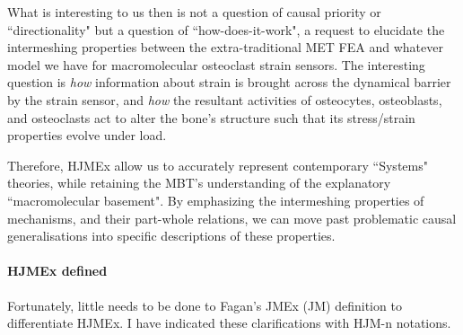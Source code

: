 \begin{enumerate}
 What is interesting to us then is not a question of causal priority or ``directionality" but a question of ``how-does-it-work", a request to elucidate the intermeshing properties between the extra-traditional MET FEA and whatever model we have for macromolecular osteoclast strain sensors. The interesting question is \textit{how} information about strain is brought across the dynamical barrier by the strain sensor, and \textit{how} the resultant activities of osteocytes, osteoblasts, and osteoclasts act to alter the bone's structure such that its stress/strain properties evolve under load.
\end{enumerate}
 
Therefore, HJMEx allow us to accurately represent contemporary ``Systems" theories, while retaining the MBT's understanding of the explanatory ``macromolecular basement". By emphasizing the intermeshing properties of mechanisms, and their part-whole relations, we can move past problematic causal generalisations into specific descriptions of these properties.

\paragraph{HJMEx defined}

Fortunately, little needs to be done to Fagan's JMEx (JM) definition to differentiate HJMEx. I have indicated these clarifications with HJM-n notations.

